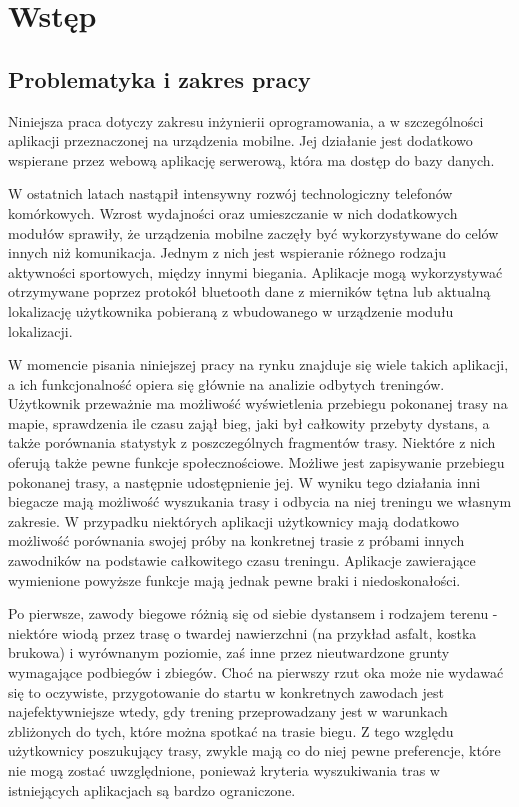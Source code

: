 \chapter{Wstęp}\label{chap:introduction}

\section{Problematyka i zakres pracy}
Niniejsza praca dotyczy zakresu inżynierii oprogramowania, a w szczególności aplikacji przeznaczonej na urządzenia mobilne. Jej działanie jest dodatkowo wspierane przez webową aplikację serwerową, która ma dostęp do bazy danych.

W ostatnich latach nastąpił intensywny rozwój technologiczny telefonów komórkowych. Wzrost wydajności oraz umieszczanie w nich dodatkowych modułów sprawiły, że urządzenia mobilne zaczęły być wykorzystywane do celów innych niż komunikacja. Jednym z nich jest wspieranie różnego rodzaju aktywności sportowych, między innymi biegania. Aplikacje mogą wykorzystywać otrzymywane poprzez protokół bluetooth dane z mierników tętna lub aktualną lokalizację użytkownika pobieraną z wbudowanego w urządzenie modułu lokalizacji.

W momencie pisania niniejszej pracy na rynku znajduje się wiele takich aplikacji, a ich funkcjonalność opiera się głównie na analizie odbytych treningów. Użytkownik przeważnie ma możliwość wyświetlenia przebiegu pokonanej trasy na mapie, sprawdzenia ile czasu zajął bieg, jaki był całkowity przebyty dystans, a także porównania statystyk z poszczególnych fragmentów trasy. Niektóre z nich oferują także pewne funkcje społecznościowe. Możliwe jest zapisywanie przebiegu pokonanej trasy, a następnie udostępnienie jej. W wyniku tego działania inni biegacze mają możliwość wyszukania trasy i odbycia na niej treningu we własnym zakresie. W przypadku niektórych aplikacji użytkownicy mają dodatkowo możliwość porównania swojej próby na konkretnej trasie z próbami innych zawodników na podstawie całkowitego czasu treningu. Aplikacje zawierające wymienione powyższe funkcje mają jednak pewne braki i niedoskonałości.

Po pierwsze, zawody biegowe różnią się od siebie dystansem i rodzajem terenu - niektóre wiodą przez trasę o twardej nawierzchni (na przykład asfalt, kostka brukowa) i wyrównanym poziomie, zaś inne przez nieutwardzone grunty wymagające podbiegów i zbiegów. Choć na pierwszy rzut oka może nie wydawać się to oczywiste, przygotowanie do startu w konkretnych zawodach jest najefektywniejsze wtedy, gdy trening przeprowadzany jest w warunkach zbliżonych do tych, które można spotkać na trasie biegu. Z tego względu użytkownicy poszukujący trasy, zwykle mają co do niej pewne preferencje, które nie mogą zostać uwzględnione, ponieważ kryteria wyszukiwania tras w istniejących aplikacjach są bardzo ograniczone.

